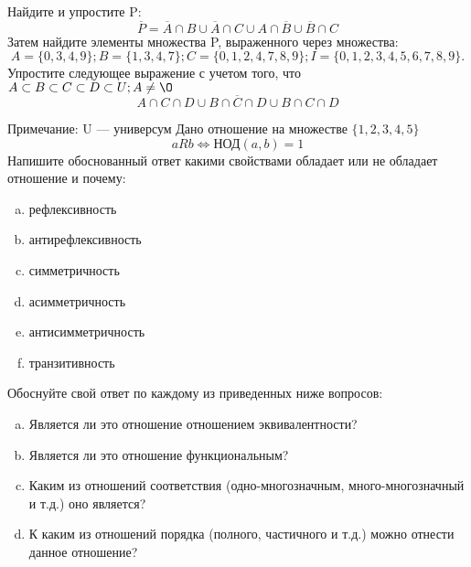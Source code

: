 \documentclass[10pt]{exam}
\begin{document}
\begin{questions}
\question
Найдите и упростите P:
\begin{equation*}
\overline{P} = \overline{A} \cap B \cup \overline{A} \cap C \cup A \cap \overline{B} \cup \overline{B} \cap C
\end{equation*}
Затем найдите элементы множества P, выраженного через множества:
\begin{equation*}
A = \{0, 3, 4, 9\}; 
B = \{1, 3, 4, 7\};
C = \{0, 1, 2, 4, 7, 8, 9\};
I = \{0, 1, 2, 3, 4, 5, 6, 7, 8, 9\}.
\end{equation*}\question
Упростите следующее выражение с учетом того, что $A\subset B \subset C \subset D \subset U; A \neq \O$
\begin{equation*}
A \cap C  \cap D \cup B \cap \overline{C} \cap D \cup B \cap C \cap D
\end{equation*}

Примечание: U — универсум\question
Дано отношение на множестве $\{1, 2, 3, 4, 5\}$ 
\begin{equation*}
aRb \iff  \text{НОД}(a,b) =1
\end{equation*}
Напишите обоснованный ответ какими свойствами обладает или не обладает отношение и почему:   
\begin{enumerate} [a)]\setcounter{enumi}{0}
\item рефлексивность
\item антирефлексивность
\item симметричность
\item асимметричность
\item антисимметричность
\item транзитивность
\end{enumerate}

Обоснуйте свой ответ по каждому из приведенных ниже вопросов:
\begin{enumerate} [a)]\setcounter{enumi}{0}
    \item Является ли это отношение отношением эквивалентности?
    \item Является ли это отношение функциональным?
    \item Каким из отношений соответствия (одно-многозначным, много-многозначный и т.д.) оно является?
    \item К каким из отношений порядка (полного, частичного и т.д.) можно отнести данное отношение?
\end{enumerate}



\end{questions}
\end{document}
